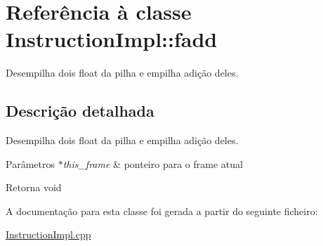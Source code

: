 \hypertarget{class_instruction_impl_1_1fadd}{}\section{Referência à classe Instruction\+Impl\+:\+:fadd}
\label{class_instruction_impl_1_1fadd}


Desempilha dois float da pilha e empilha adição deles.  




\subsection{Descrição detalhada}
Desempilha dois float da pilha e empilha adição deles. 


\begin{DoxyParams}{Parâmetros}
{\em $\ast$this\+\_\+frame} & ponteiro para o frame atual \\
\hline
\end{DoxyParams}
\begin{DoxyReturn}{Retorna}
void 
\end{DoxyReturn}


A documentação para esta classe foi gerada a partir do seguinte ficheiro\+:\begin{DoxyCompactItemize}
\item 
\hyperlink{_instruction_impl_8cpp}{Instruction\+Impl.\+cpp}\end{DoxyCompactItemize}
